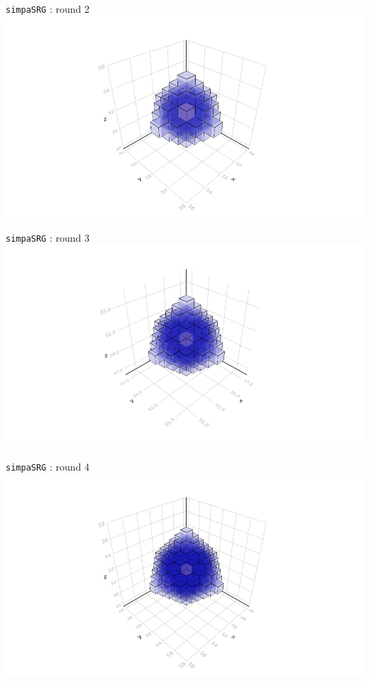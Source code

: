 \documentclass{beamer}
\begin{document}
\begin{frame}{\texttt{simpaSRG} : round 2}
\includegraphics[trim=5cm 0.7cm 5cm 3cm, clip, width=1\linewidth]{algorithm_visualisation/srgthreads2/srg2threads2.png}\\
\end{frame}
\begin{frame}{\texttt{simpaSRG} : round 3}
\includegraphics[trim=5cm 0.7cm 5cm 3cm, clip, width=1\linewidth]{algorithm_visualisation/srgthreads2/srg2threads3.png}\\
\end{frame}
\begin{frame}{\texttt{simpaSRG} : round 4}
\includegraphics[trim=5cm 0.7cm 5cm 3cm, clip, width=1\linewidth]{algorithm_visualisation/srgthreads2/srg2threads4.png}\\
\end{frame}
\end{document}
